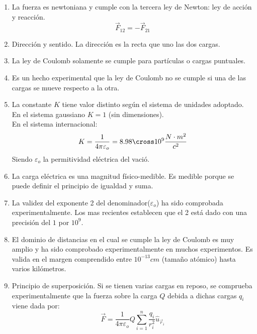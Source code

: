 \documentclass[../main]{subfiles}
\begin{document}
\begin{enumerate}
    \item La fuerza es newtoniana y cumple con la tercera ley de Newton: ley de acción y reacción.
    \begin{equation}
        \vec{F}_{12}=-\vec{F}_{21}
    \end{equation}
    \item Dirección y sentido. La dirección es la recta que uno las dos cargas.
    \item La ley de Coulomb solamente se cumple para partículas o cargas puntuales.
    \item Es un hecho experimental que la ley de Coulomb no se cumple si una de las cargas se mueve respecto a la otra.
    \item La constante $K$ tiene valor distinto según el sistema de unidades adoptado. \\
    En el sistema gaussiano $K=1$ (sin dimensiones).\\
    En el sistema internacional:
    \begin{equation}
        K=\dfrac{1}{4\pi \varepsilon_o}=8.98\cross 10^9 \dfrac{N\cdot m^2}{c^2}
    \end{equation}
    Siendo $\varepsilon_o$ la permitividad eléctrica del vació.
    \item La carga eléctrica es una magnitud físico-medible. Es medible porque se puede definir el principio de igualdad y suma.
    \item La validez del exponente 2 del denominador($\varepsilon_o$) ha sido comprobada experimentalmente. Los mas recientes establecen que el 2 está dado con una precisión del $1$ por $10^9$.
    \item El dominio de distancias en el cual se cumple la ley de Coulomb es muy amplio y ha sido comprobado experimentalmente en muchos experimentos. Es valida en el margen comprendido entre $10^{-13}cm$ (tamaño atómico) hasta varios kilómetros.
    \item Principio de superposición. Si se tienen varias cargas en reposo, se comprueba experimentalmente que la fuerza sobre la carga $Q$ debida a dichas cargas $q_i$ viene dada por:
    \begin{equation}
        \boxed{\vec{F}=\dfrac{1}{4\pi \varepsilon_o} Q \sum_{i=1}^n \dfrac{q_i}{r_i^2} \hat{u}_{\vec{r}_i}}
    \end{equation}
\end{enumerate}
\end{document}

